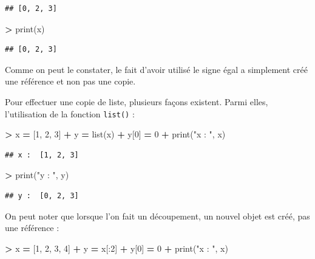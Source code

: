 \documentclass[12pt,]{book}
\newenvironment{Shaded}{\begin{snugshade}}{\end{snugshade}}
\newcommand{\DecValTok}[1]{\textcolor[rgb]{0.00,0.00,0.81}{#1}}
\newcommand{\StringTok}[1]{\textcolor[rgb]{0.31,0.60,0.02}{#1}}
\newcommand{\OperatorTok}[1]{\textcolor[rgb]{0.81,0.36,0.00}{\textbf{#1}}}
\newcommand{\BuiltInTok}[1]{#1}
\newcommand{\NormalTok}[1]{#1}
\numberwithin{equation}{section}
\numberwithin{countremarque}{section}
\begin{document}
\begin{lstlisting}
## [0, 2, 3]
\end{lstlisting}

\begin{Shaded}
\begin{Highlighting}[]
\OperatorTok{>} \BuiltInTok{print}\NormalTok{(x)}
\end{Highlighting}
\end{Shaded}

\begin{lstlisting}
## [0, 2, 3]
\end{lstlisting}

Comme on peut le constater, le fait d'avoir utilisé le signe égal a
simplement créé une référence et non pas une copie.

Pour effectuer une copie de liste, plusieurs façons existent. Parmi
elles, l'utilisation de la fonction \texttt{list()} :

\begin{Shaded}
\begin{Highlighting}[]
\OperatorTok{>}\NormalTok{ x }\OperatorTok{=}\NormalTok{ [}\DecValTok{1}\NormalTok{, }\DecValTok{2}\NormalTok{, }\DecValTok{3}\NormalTok{]}
\OperatorTok{+}\NormalTok{ y }\OperatorTok{=} \BuiltInTok{list}\NormalTok{(x)}
\OperatorTok{+}\NormalTok{ y[}\DecValTok{0}\NormalTok{] }\OperatorTok{=} \DecValTok{0}
\OperatorTok{+} \BuiltInTok{print}\NormalTok{(}\StringTok{"x : "}\NormalTok{, x)}
\end{Highlighting}
\end{Shaded}

\begin{lstlisting}
## x :  [1, 2, 3]
\end{lstlisting}

\begin{Shaded}
\begin{Highlighting}[]
\OperatorTok{>} \BuiltInTok{print}\NormalTok{(}\StringTok{"y : "}\NormalTok{, y)}
\end{Highlighting}
\end{Shaded}

\begin{lstlisting}
## y :  [0, 2, 3]
\end{lstlisting}

On peut noter que lorsque l'on fait un découpement, un nouvel objet est
créé, pas une référence :

\begin{Shaded}
\begin{Highlighting}[]
\OperatorTok{>}\NormalTok{ x }\OperatorTok{=}\NormalTok{ [}\DecValTok{1}\NormalTok{, }\DecValTok{2}\NormalTok{, }\DecValTok{3}\NormalTok{, }\DecValTok{4}\NormalTok{]}
\OperatorTok{+}\NormalTok{ y }\OperatorTok{=}\NormalTok{ x[:}\DecValTok{2}\NormalTok{]}
\OperatorTok{+}\NormalTok{ y[}\DecValTok{0}\NormalTok{] }\OperatorTok{=} \DecValTok{0}
\OperatorTok{+} \BuiltInTok{print}\NormalTok{(}\StringTok{"x : "}\NormalTok{, x)}
\end{Highlighting}
\end{Shaded}
\end{document}
